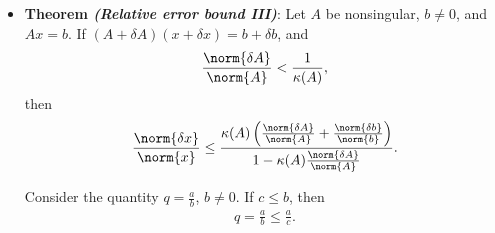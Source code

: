 \documentclass{report}
\begin{document}
\begin{itemize}
    \item \textbf{Theorem \textit{(Relative error bound III)}}:  Let $A$ be nonsingular, $b\ne 0$, and $Ax=b$. If $(A + \delta A)(x + \delta x) = b + \delta  b$, and 
        \begin{align*}
            \frac{\norm{\delta  A}}{\norm{A}} < \frac{1}{\kappa(A)},
        \end{align*}
        then
        \begin{align*}
            \frac{\norm{\delta x}}{\norm{x}} \leq \frac{\kappa(A)\left(\frac{\norm{\delta A}}{\norm{A}} + \frac{\norm{\delta b}}{\norm{b}}\right)}{1-\kappa(A)\frac{\norm{\delta A}}{\norm{A}}}
        .\end{align*}
        \bigbreak \noindent 
        \begin{remark}[a] Consider the quantity $q = \frac{a}{b}$, $b\ne 0$. If $c \leq b$, then 
            \begin{align*}
                q = \frac{a}{b} \leq \frac{a}{c}
            .\end{align*}
            
        \end{remark} 
        

\end{itemize}
\end{document}
